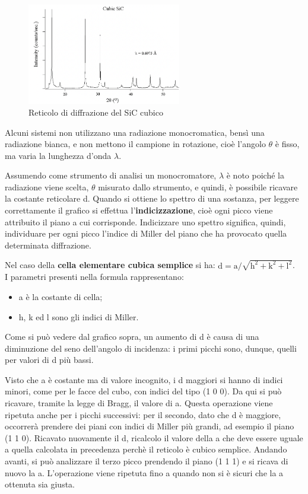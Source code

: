 \begin{figure}[hb]
    \includegraphics[width=0.6\textwidth]{images/img13.png}
    \caption{Reticolo di diffrazione del SiC cubico }
\end{figure}

Alcuni sistemi non utilizzano una radiazione monocromatica, bensì una radiazione bianca, e non mettono il campione in rotazione, cioè l’angolo $\theta$ è fisso, ma varia la lunghezza d’onda $\lambda$.

Assumendo come strumento di analisi un monocromatore, $\lambda$ è noto poiché la radiazione viene scelta, $\theta$ misurato dallo strumento, e quindi, è possibile ricavare la costante reticolare d.
Quando si ottiene lo spettro di una sostanza, per leggere correttamente il grafico si effettua l’\textbf{indicizzazione}, cioè ogni picco viene attribuito il piano a cui corrisponde. Indicizzare uno spettro significa, quindi, individuare per ogni picco l’indice di Miller del piano che ha provocato quella determinata diffrazione.

Nel caso della \textbf{cella elementare cubica semplice} si ha: $\mathrm{d = a/\sqrt{h^2+k^2+l^2}}$.\\
I parametri presenti nella formula rappresentano:
\begin{itemize}
    \item a è la costante di cella;
    \item h, k ed l sono gli indici di Miller.
\end{itemize}

Come si può vedere dal grafico sopra, un aumento di d è causa di una diminuzione del seno dell’angolo di incidenza: i primi picchi sono, dunque, quelli per valori di d più bassi.

Visto che a è costante ma di valore incognito, i d maggiori si hanno di indici minori, come per le facce del cubo, con indici del tipo (1 0 0). Da qui si può ricavare, tramite la legge di Bragg, il valore di a. Questa operazione viene ripetuta anche per i picchi successivi: per il secondo, dato che d è maggiore, occorrerà prendere dei piani con indici di Miller più grandi, ad esempio il piano (1 1 0). Ricavato nuovamente il d, ricalcolo il valore della a che deve essere uguale a quella calcolata in precedenza perchè il reticolo è cubico semplice. Andando avanti, si può analizzare il terzo picco prendendo il piano (1 1 1) e si ricava di nuovo la a. L’operazione viene ripetuta fino a quando non si è sicuri che la a ottenuta sia giusta.

